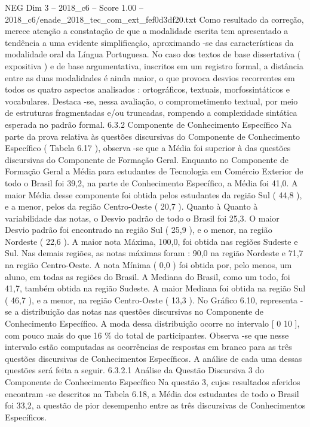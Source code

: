 \begin{textsample}{NEG Dim 3 – 2018\_c6 – Score 1.00 – 2018\_c6/enade\_2018\_tec\_com\_ext\_fef0d3df20.txt}
Como resultado da correção, merece atenção a constatação de que a modalidade escrita tem apresentado a tendência a uma evidente simplificação, aproximando -se das características da modalidade oral da Língua Portuguesa.
No caso dos textos de base dissertativa ( expositiva ) e de base argumentativa, inscritos em um registro formal, a distância entre as duas modalidades é ainda maior, o que provoca desvios recorrentes em todos os quatro aspectos analisados : ortográficos, textuais, morfossintáticos e vocabulares.
Destaca -se, nessa avaliação, o comprometimento textual, por meio de estruturas fragmentadas e/ou truncadas, rompendo a complexidade sintática esperada no padrão formal. 6.3.2 Componente de Conhecimento Específico Na parte da prova relativa às questões discursivas do Componente de Conhecimento Específico ( Tabela 6.17 ), observa -se que a Média foi superior à das questões discursivas do Componente de Formação Geral.
Enquanto no Componente de Formação Geral a Média para estudantes de Tecnologia em Comércio Exterior de todo o Brasil foi 39,2, na parte de Conhecimento Específico, a Média foi 41,0.
A maior Média desse componente foi obtida pelos estudantes da região Sul ( 44,8 ), e a menor, pelos da região Centro-Oeste ( 20,7 ).
Quanto à Quanto à variabilidade das notas, o Desvio padrão de todo o Brasil foi 25,3.
O maior Desvio padrão foi encontrado na região Sul ( 25,9 ), e o menor, na região Nordeste ( 22,6 ).
A maior nota Máxima, 100,0, foi obtida nas regiões Sudeste e Sul.
Nas demais regiões, as notas máximas foram : 90,0 na região Nordeste e 71,7 na região Centro-Oeste.
A nota Mínima ( 0,0 ) foi obtida por, pelo menos, um aluno, em todas as regiões do Brasil.
A Mediana do Brasil, como um todo, foi 41,7, também obtida na região Sudeste.
A maior Mediana foi obtida na região Sul ( 46,7 ), e a menor, na região Centro-Oeste ( 13,3 ).
No Gráfico 6.10, representa -se a distribuição das notas nas questões discursivas no Componente de Conhecimento Específico.
A moda dessa distribuição ocorre no intervalo [ 0 10 ], com pouco mais do que 16 \% do total de participantes.
Observa -se que nesse intervalo estão computadas as ocorrências de respostas em branco para as três questões discursivas de Conhecimentos Específicos.
A análise de cada uma dessas questões será feita a seguir. 6.3.2.1 Análise da Questão Discursiva 3 do Componente de Conhecimento Específico Na questão 3, cujos resultados aferidos encontram -se descritos na Tabela 6.18, a Média dos estudantes de todo o Brasil foi 33,2, a questão de pior desempenho entre as três discursivas de Conhecimentos Específicos.

\end{textsample}
